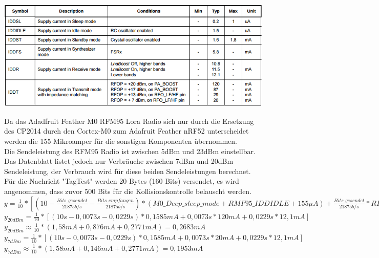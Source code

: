 \begin{table}[h]
  \centering
  \caption{Stromverbrauch des RFM95, aus \cite{hope2006rfm}}
	\includegraphics[width=\textwidth]{images/lorapower.png}
  \label{table:lorapower}
\end{table}

Da das Adadfruit Feather M0 RFM95 Lora Radio sich nur durch die Ersetzung des CP2014 durch den Cortex-M0 zum Adafruit Feather nRF52 unterscheidet werden die 155 Mikroamper für die sonstigen Komponenten übernommen.\\
Die Sendeleistung des RFM95 Radio ist zwischen 5dBm und 23dBm einstellbar. 
Das Datenblatt listet jedoch nur Verbräuche zwischen 7dBm und 20dBm Sendeleistung, der Verbrauch wird für diese beiden Sendeleistungen berechnet.
Für die Nachricht "{}TagTest"{} werden 20 Bytes (160 Bits) versendet, es wird angenommen, dass zuvor 500 Bits für die Kollisionskontrolle belauscht werden.\\[1cm]

$y = \frac{1}{10} * [(10 - \frac{Bits\_gesendet}{21875 b/s} - \frac{Bits\_empfangen}{21875 b/s}) * (M0\_Deep\_sleep\_mode + RMF95\_IDDIDLE + 155 {\mu}A) + \frac{Bits\_gesendet}{21875 b/s} * RFM95\_XdBm + \frac{Bits\_empfangen}{21875 b/s} * RFM95\_IDDR]$\\[0.5cm]
$y_{20dBm} = \frac{1}{10} * [(10s - 0,0073s - 0,0229s) * 0,1585mA + 0,0073s * 120mA + 0,0229s * 12,1mA]$\\[0.5cm]
$y_{20dBm} \approx \frac{1}{10} * (1,58mA + 0,876mA + 0,2771mA) = 0,2683mA$\\[1cm]

$y_{7dBm} = \frac{1}{10} * [(10s - 0,0073s - 0,0229s) * 0,1585mA + 0,0073s * 20mA + 0,0229s * 12,1mA]$\\[0.5cm]
$y_{7dBm} \approx \frac{1}{10} * (1,58mA + 0,146mA + 0,2771mA) = 0,1953mA$\\[1cm]

